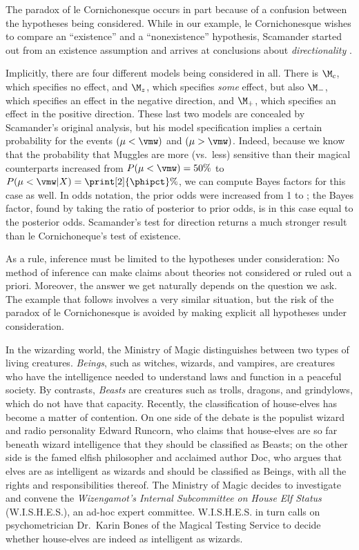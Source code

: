 The paradox of le Cornichonesque occurs in part because of a confusion between the hypotheses being considered. While in our example, le Cornichonesque wishes to compare an ``existence'' and a ``nonexistence'' hypothesis, Scamander started out from an existence assumption and arrives at conclusions about \emph{directionality} \cite<see also>{marsman2016}.

Implicitly, there are four different models being considered in all. There is $\M_c$, which specifies no effect, and $\M_z$, which specifies \emph{some} effect, but also $\M_-$, which specifies an effect in the negative direction, and $\M_+$, which specifies an effect in the positive direction. These last two models are concealed by Scamander's original analysis, but his model specification implies a certain probability for the events $(\mu < \vmw)$ and $(\mu > \vmw)$. Indeed, because we know that the probability that Muggles are more (vs.~less) sensitive than their magical counterparts increased from $P(\mu < \vmw) = 50\%$ to $P(\mu < \vmw|X) = \print[2]{\phipct}\%$, we can compute Bayes factors for this case as well. In odds notation, the prior odds were increased from 1 to \tmp;  the Bayes factor, found by taking the ratio of posterior to prior odds, is in this case equal to the posterior odds.  Scamander's test for direction returns a much stronger result than le Cornichoneque's test of existence.

As a rule, inference must be limited to the hypotheses under consideration: No method of inference can make claims about theories not considered or ruled out a priori. Moreover, the answer we get naturally depends on the question we ask. The example that follows involves a very similar situation, but the risk of the paradox of le Cornichonesque is avoided by making explicit all hypotheses under consideration.

 \label{ex:elf}
In the wizarding world, the Ministry of Magic distinguishes between two types of living creatures. \emph{Beings}, such as witches, wizards, and vampires, are creatures who have the intelligence needed to understand laws and function in a peaceful society. By contrasts, \emph{Beasts} are creatures such as trolls, dragons, and grindylows, which do not have that capacity. Recently, the classification of house-elves has become a matter of contention.  On one side of the debate is the populist wizard and radio personality Edward Runcorn, who claims that house-elves are so far beneath wizard intelligence that they should be classified as Beasts; on the other side is the famed elfish philosopher and acclaimed author Doc, who argues that elves are as intelligent as wizards and should be classified as Beings, with all the rights and responsibilities thereof.\newcommand{\wishes}{{W.I.S.H.E.S.\xspace}} 
The Ministry of Magic decides to investigate and convene the \emph{Wizengamot's Internal Subcommittee on House Elf Status} (\wishes), an ad-hoc expert committee. \wishes{} in turn calls on psychometrician Dr.\ Karin 
Bones of the Magical Testing Service to decide whether house-elves are indeed as intelligent as wizards.

